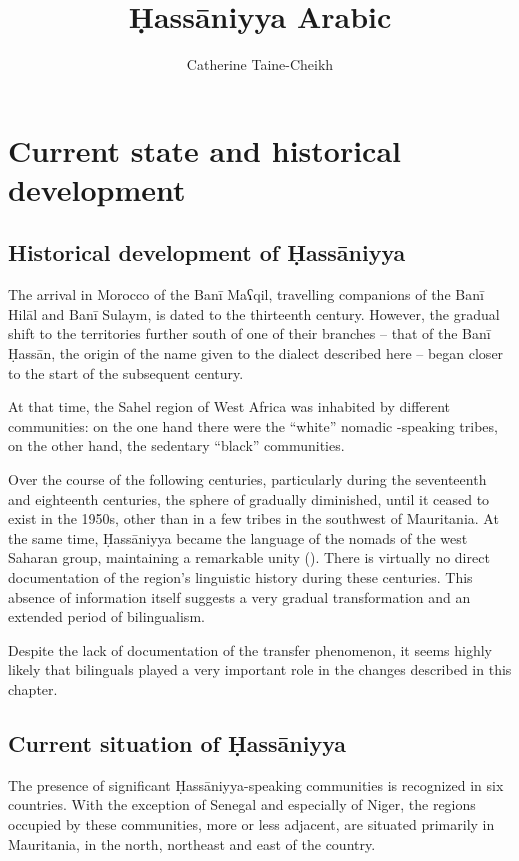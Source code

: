\documentclass[output=paper]{langsci/langscibook}
\author{Catherine Taine-Cheikh\affiliation{CNRS, LACITO}}
\title{Ḥassāniyya Arabic}
\begin{document}
\maketitle 
 

\section{Current state and historical development}

\subsection{Historical development of Ḥassāniyya} %

The arrival in Morocco of the Banī Maʕqil, travelling companions of the Banī Hilāl and Banī Sulaym, is dated to the thirteenth century. However, the gradual shift to the territories further south of one of their branches – that of the Banī Ḥassān, the origin of the name given to the dialect described here – began closer to the start of the subsequent century. 

At that time, the Sahel region of West Africa was inhabited by different communities: on the one hand there were the “white” nomadic -speaking tribes, on the other hand, the sedentary “black” communities.

Over the course of the following centuries, particularly during the seventeenth and eighteenth centuries, the sphere of   gradually diminished, until it ceased to exist in the 1950s, other than in a few tribes in the southwest of Mauritania. At the same time, Ḥassāniyya  became the language of the nomads of the west Saharan group, maintaining a remarkable unity (\citealt{Taine-Cheikh2016,Taine-Cheikh2018historical}). There is virtually no direct documentation of the region’s linguistic history during these centuries. This absence of information itself suggests a very gradual transformation and an extended period of {bilingualism}.

Despite the lack of documentation of the {transfer} phenomenon, it seems highly likely that bilinguals played a very important role in the changes described in this chapter. 

\subsection{Current situation of Ḥassāniyya} %

The presence of significant Ḥassāniyya-speaking communities is recognized in six countries. With the exception of Senegal and especially of Niger, the regions occupied by these communities, more or less adjacent, are situated primarily in Mauritania, in the north, northeast and east of the country. 
\end{document}
